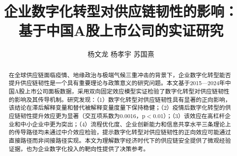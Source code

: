 \documentclass{chinese-erj}
\title{企业数字化转型对供应链韧性的影响：\\基于中国A股上市公司的实证研究}
\author{杨文龙 \quad 杨孝宇 \quad 苏国熹}
\begin{document}
\maketitle

\begin{abstract}
在全球供应链面临疫情、地缘政治与极端气候三重冲击的背景下，企业数字化转型能否提升供应链韧性是一个具有重要理论与政策意义的研究问题。本文基于2015—2024年中国A股上市公司面板数据，采用双向固定效应模型实证检验了数字化转型对供应链韧性的影响及其传导机制。研究发现：（1）数字化转型对供应链韧性具有显著的正向影响，该结论在滞后解释变量和替代被解释变量度量下保持稳健；（2）疫情后数字化转型的供应链韧性提升效应更为显著（交互项系数为0.0016，p$<$0.01）；（3）该效应在高杠杆企业和中小企业中更为突出；（4）流程优化度、企业创新能力和信息共享水平三条理论上的传导路径均未通过中介效应检验，提示数字化转型对供应链韧性的正向效应可能通过直接路径而非间接路径实现。本文为理解数字经济时代下的供应链安全提供了微观经验证据，也为企业数字化投入的靶向性提供了决策参考。

\end{abstract}







\clearpage
\erjref
\printbibliography[heading=none]

\swufeback
\end{document}
